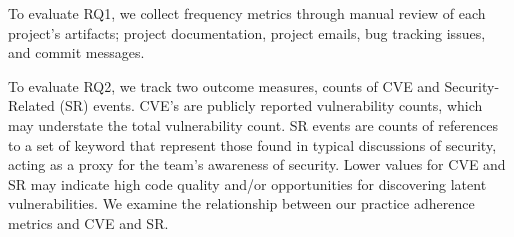 To evaluate RQ1, we collect frequency metrics through manual review of each project’s artifacts; project documentation, project emails, bug tracking issues, and commit messages.  

To evaluate RQ2, we track two outcome measures, counts of CVE and Security-Related (SR) events. CVE's are publicly reported vulnerability counts, which may understate the total vulnerability count.  SR events are counts of references to a set of keyword that represent those found in typical discussions of security, acting as a proxy for the team's awareness of security. Lower values for CVE and SR may indicate high code quality and/or opportunities for discovering latent vulnerabilities. We examine the relationship between our practice adherence metrics and CVE and SR.
